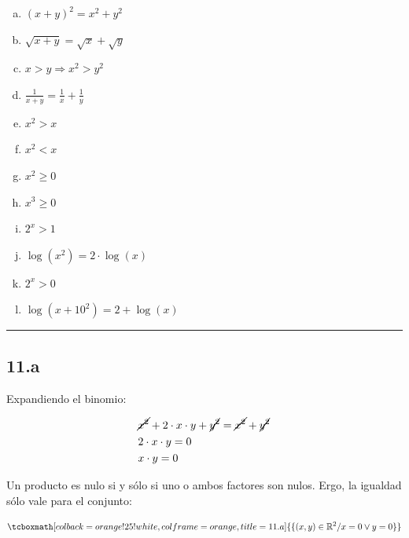 \documentclass{article}
\newcommand{\hresult}[2]{\tcboxmath[colback=orange!25!white,colframe=orange, title=#1] {#2} }
\begin{document}
\begin{enumerate}[(a)]
\bfseries

\item $ (x+y)^2 = x^2 + y^2 $

\item $ \sqrt{x + y} = \sqrt{x} + \sqrt{y} $

\item $ x > y \Rightarrow x^2 > y^2 $

\item $ \frac{1}{x+y} = \frac{1}{x} + \frac{1}{y} $

\item $ x^2 > x $

\item $ x^2 < x $

\item $ x^2 \geq 0 $

\item $ x^3 \geq 0 $

\item $ 2^x > 1 $

\item $ \log(x^2) = 2 \cdot \log(x) $

\item $ 2^x > 0 $

\item $ \log(x + 10^2) = 2 + \log(x) $

\end{enumerate}
\hrule

\subsection*{11.a}
\label{subsec:11.a}

Expandiendo el binomio:

\begin{subequations}
\begin{align}
& \cancel{x^2} + 2 \cdot x \cdot y + \cancel{y^2} = \cancel{x^2} + \cancel{y^2} \\
& 2 \cdot x \cdot y = 0 \\
& x \cdot y = 0
\end{align}
\end{subequations}

Un producto es nulo si y sólo si uno o ambos factores son nulos. Ergo, la igualdad sólo vale para el conjunto:

\begin{equation}
\hresult{11.a}{ \{ (x,y) \in \mathbb{R}^2 / x = 0 \vee y = 0 \} }
\end{equation}
\end{document}
